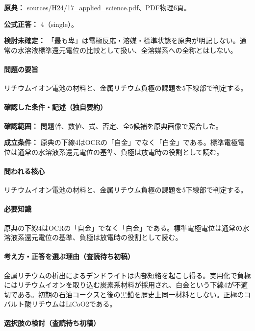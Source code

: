 \noindent\textbf{原典：} sources/H24/17\_applied\_science.pdf、PDF物理6頁。

\textbf{公式正答：} 4（single）。

\par\textbf{検討未確定：} 「最も卑」は電極反応・溶媒・標準状態を原典が明記しない。通常の水溶液標準還元電位の比較として扱い、全溶媒系への全称とはしない。

\paragraph{問題の要旨} リチウムイオン電池の材料と、金属リチウム負極の課題を5下線部で判定する。

\paragraph{確認した条件・記述（独自要約）}\mbox{}\par

\noindent\textbf{確認範囲：} 問題幹、数値、式、否定、全5候補を原典画像で照合した。\par

\noindent\textbf{成立条件：} 原典の下線4はOCRの「自金」でなく「白金」である。標準電極電位は通常の水溶液系還元電位の基準、負極は放電時の役割として読む。\par

\paragraph{問われる核心} リチウムイオン電池の材料と、金属リチウム負極の課題を5下線部で判定する。

\paragraph{必要知識} 原典の下線4はOCRの「自金」でなく「白金」である。標準電極電位は通常の水溶液系還元電位の基準、負極は放電時の役割として読む。

\paragraph{考え方・正答を選ぶ理由（査読待ち初稿）} 金属リチウムの析出によるデンドライトは内部短絡を起こし得る。実用化で負極にはリチウムイオンを取り込む炭素系材料が採用され、白金という下線4が不適切である。初期の石油コークスと後の黒鉛を歴史上同一材料としない。正極のコバルト酸リチウムはLiCoO2である。

\paragraph{選択肢の検討（査読待ち初稿）}\mbox{}\par

